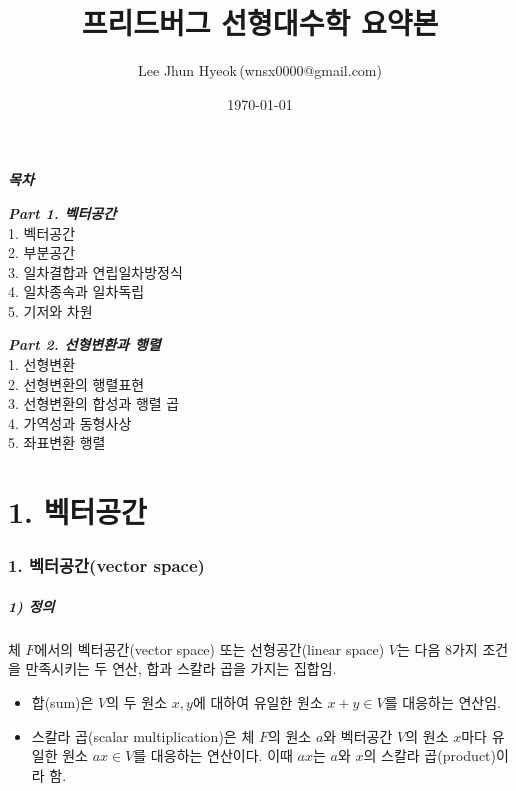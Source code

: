 \documentclass[10pt, a4paper]{article}
\title{\textbf{{\Huge 프리드버그 선형대수학 요약본}}}
\author{Lee Jhun Hyeok\,(wnsx0000@gmail.com)}
\date{\today}
\begin{document}
\maketitle

\textbf{\textit{목차}}

\textbf{\textit{Part 1. 벡터공간\\}}
1. 벡터공간\\
2. 부분공간\\
3. 일차결합과 연립일차방정식\\
4. 일차종속과 일차독립\\
5. 기저와 차원

\textbf{\textit{Part 2. 선형변환과 행렬\\}}
1. 선형변환\\
2. 선형변환의 행렬표현\\
3. 선형변환의 합성과 행렬 곱\\
4. 가역성과 동형사상\\
5. 좌표변환 행렬

\newpage

\part*{1. 벡터공간}

\section*{1. 벡터공간(vector space)}

\subsubsection*{1) 정의}

체 $F$에서의 벡터공간(vector space) 또는 선형공간(linear space) $V$는 다음 8가지 조건을 만족시키는 두 연산, 합과 스칼라 곱을 가지는 집합임.

\begin{itemize}
\item 합(sum)은 $V$의 두 원소 $x, y$에 대하여 유일한 원소 $x+y \in V$를 대응하는 연산임.
\item 스칼라 곱(scalar multiplication)은 체 $F$의 원소 $a$와 벡터공간 $V$의 원소 $x$마다 유일한 원소 $ax \in V$를 대응하는 연산이다. 이때 $ax$는 $a$와 $x$의 스칼라 곱(product)이라 함.
\end{itemize}
\end{document}
